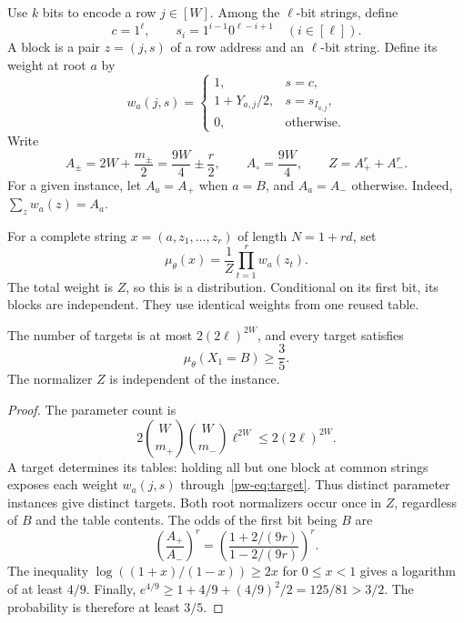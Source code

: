 Use $k$ bits to encode a row $j\in[W]$. Among the $\ell$-bit strings, define
\[
c=1^\ell,\qquad s_i=1^{i-1}0^{\ell-i+1}\quad(i\in[\ell]).
\]
A block is a pair $z=(j,s)$ of a row address and an $\ell$-bit string. Define its weight at root $a$ by
\begin{equation}\label{pw-eq:block}
w_a(j,s)=
\begin{cases}
1,&s=c,\\
1+Y_{a,j}/2,&s=s_{I_{a,j}},\\
0,&\text{otherwise}.
\end{cases}
\end{equation}
Write
\begin{equation}\label{pw-eq:normalizers}
A_\pm=2W+\frac{m_\pm}{2}=\frac{9W}{4}\pm\frac r2,
\qquad A_\circ=\frac{9W}{4},\qquad Z=A_+^r+A_-^r.
\end{equation}
For a given instance, let $A_a=A_+$ when $a=B$, and $A_a=A_-$ otherwise. Indeed, $\sum_z w_a(z)=A_a$.

For a complete string $x=(a,z_1,\ldots,z_r)$ of length $N=1+rd$, set
\begin{equation}\label{pw-eq:target}
\mu_\theta(x)=\frac1Z\prod_{t=1}^r w_a(z_t).
\end{equation}
The total weight is $Z$, so this is a distribution. Conditional on its first bit, its blocks are independent. They use identical weights from one reused table.

\begin{lemma}\label{pw-lem:size-root}
The number of targets is at most $2(2\ell)^{2W}$, and every target satisfies
\begin{equation}\label{pw-eq:rootgap}
\mu_\theta(X_1=B)\ge\frac35.
\end{equation}
The normalizer $Z$ is independent of the instance.
\end{lemma}
\begin{proof}
The parameter count is
\[
2\binom{W}{m_+}\binom{W}{m_-}\ell^{2W}
\le 2(2\ell)^{2W}.
\]
A target determines its tables: holding all but one block at common strings exposes each weight $w_a(j,s)$ through~\eqref{pw-eq:target}. Thus distinct parameter instances give distinct targets. Both root normalizers occur once in $Z$, regardless of $B$ and the table contents. The odds of the first bit being $B$ are
\[
\left(\frac{A_+}{A_-}\right)^r
=\left(\frac{1+2/(9r)}{1-2/(9r)}\right)^r.
\]
The inequality $\log((1+x)/(1-x))\ge2x$ for $0\le x<1$ gives a logarithm of at least $4/9$. Finally,
$e^{4/9}\ge1+4/9+(4/9)^2/2=125/81>3/2$.
The probability is therefore at least $3/5$.
\end{proof}

